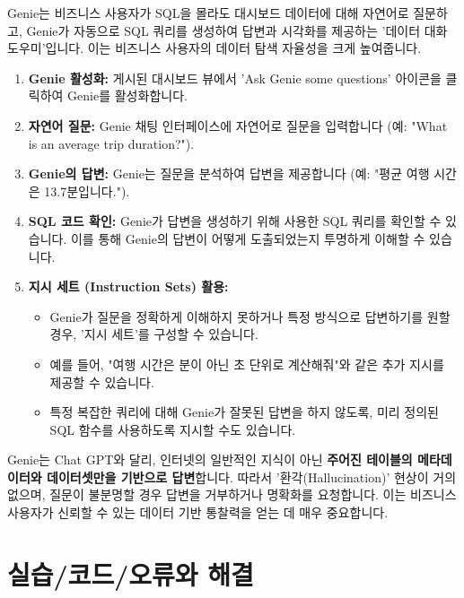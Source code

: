 \documentclass[11pt,a4paper]{article}
\begin{document}
\begin{tcolorbox}[mybox={핵심 요약: 자연어로 데이터와 대화하기}]
Genie는 비즈니스 사용자가 SQL을 몰라도 대시보드 데이터에 대해 자연어로 질문하고, Genie가 자동으로 SQL 쿼리를 생성하여 답변과 시각화를 제공하는 '데이터 대화 도우미'입니다. 이는 비즈니스 사용자의 데이터 탐색 자율성을 크게 높여줍니다.
\end{tcolorbox}

\begin{enumerate}
    \item \textbf{Genie 활성화:} 게시된 대시보드 뷰에서 'Ask Genie some questions' 아이콘을 클릭하여 Genie를 활성화합니다.
    \item \textbf{자연어 질문:} Genie 채팅 인터페이스에 자연어로 질문을 입력합니다 (예: "What is an average trip duration?").
    \item \textbf{Genie의 답변:} Genie는 질문을 분석하여 답변을 제공합니다 (예: "평균 여행 시간은 13.7분입니다.").
    \item \textbf{SQL 코드 확인:} Genie가 답변을 생성하기 위해 사용한 SQL 쿼리를 확인할 수 있습니다. 이를 통해 Genie의 답변이 어떻게 도출되었는지 투명하게 이해할 수 있습니다.
    \item \textbf{지시 세트 (Instruction Sets) 활용:}
    \begin{itemize}
        \item Genie가 질문을 정확하게 이해하지 못하거나 특정 방식으로 답변하기를 원할 경우, '지시 세트'를 구성할 수 있습니다.
        \item 예를 들어, "여행 시간은 분이 아닌 초 단위로 계산해줘"와 같은 추가 지시를 제공할 수 있습니다.
        \item 특정 복잡한 쿼리에 대해 Genie가 잘못된 답변을 하지 않도록, 미리 정의된 SQL 함수를 사용하도록 지시할 수도 있습니다.
    \end{itemize}
\end{enumerate}

\begin{tcolorbox}[myexample={Genie의 강점}]
Genie는 Chat GPT와 달리, 인터넷의 일반적인 지식이 아닌 \textbf{주어진 테이블의 메타데이터와 데이터셋만을 기반으로 답변}합니다. 따라서 '환각(Hallucination)' 현상이 거의 없으며, 질문이 불분명할 경우 답변을 거부하거나 명확화를 요청합니다. 이는 비즈니스 사용자가 신뢰할 수 있는 데이터 기반 통찰력을 얻는 데 매우 중요합니다.
\end{tcolorbox}

\newpage
\section{실습/코드/오류와 해결}
\end{document}
